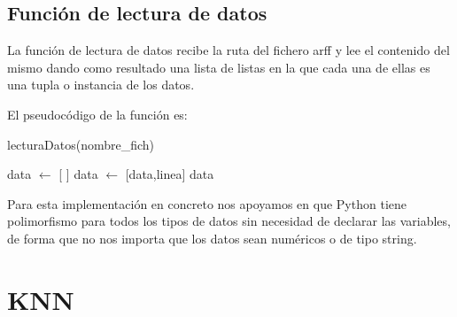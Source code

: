 \documentclass[12pt,a4paper]{article}
\begin{document}
	\subsection{Función de lectura de datos}
	
	La función de lectura de datos recibe la ruta del fichero arff y lee el contenido del mismo dando como resultado una lista de listas en la que cada una de ellas es una tupla o instancia de los datos.
	
	El pseudocódigo de la función es:
	
	\begin{algorithm}
		\caption{lecturaDatos(nombre\_fich)}
		\label{algoritmoLecturaDatos}
		\begin{algorithmic}
			\STATE data $\leftarrow$ [ ]
					\STATE data $\leftarrow$ [data,linea]
				\ENDIF
			\ENDFOR
			\RETURN data
		\end{algorithmic}
	\end{algorithm}
	
	Para esta implementación en concreto nos apoyamos en que Python tiene polimorfismo para todos los tipos de datos sin necesidad de declarar las variables, de forma que no nos importa que los datos sean numéricos o de tipo string.
	
	
	

	\section{KNN}
	\label{sec:knn}
\end{document}
